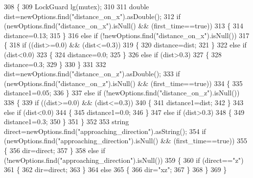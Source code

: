 \begin{DoxyCode}
308 \{
309     LockGuard lg(mutex);
310 
311     \textcolor{keywordtype}{double} dist=newOptions.find(\textcolor{stringliteral}{"distance\_on\_x"}).asDouble();
312     \textcolor{keywordflow}{if} (newOptions.find(\textcolor{stringliteral}{"distance\_on\_x"}).isNull() && (first\_time==\textcolor{keyword}{true}))
313     \{
314         distance=0.13;
315     \}
316     \textcolor{keywordflow}{else} \textcolor{keywordflow}{if} (!newOptions.find(\textcolor{stringliteral}{"distance\_on\_x"}).isNull())
317     \{
318         \textcolor{keywordflow}{if} ((dist>=0.0) && (dist<=0.3))
319         \{
320             distance=dist;
321         \}
322         \textcolor{keywordflow}{else} \textcolor{keywordflow}{if} (dist<0.0)
323         \{
324             distance=0.0;
325         \}
326         \textcolor{keywordflow}{else} \textcolor{keywordflow}{if} (dist>0.3)
327         \{
328             distance=0.3;
329         \}
330     \}
331 
332     dist=newOptions.find(\textcolor{stringliteral}{"distance\_on\_z"}).asDouble();
333     \textcolor{keywordflow}{if} (newOptions.find(\textcolor{stringliteral}{"distance\_on\_z"}).isNull() && (first\_time==\textcolor{keyword}{true}))
334     \{
335         distance1=0.05;
336     \}
337     \textcolor{keywordflow}{else} \textcolor{keywordflow}{if} (!newOptions.find(\textcolor{stringliteral}{"distance\_on\_z"}).isNull())
338     \{
339         \textcolor{keywordflow}{if} ((dist>=0.0) && (dist<=0.3))
340         \{
341             distance1=dist;
342         \}
343         \textcolor{keywordflow}{else} \textcolor{keywordflow}{if} (dist<0.0)
344         \{
345             distance1=0.0;
346         \}
347         \textcolor{keywordflow}{else} \textcolor{keywordflow}{if} (dist>0.3)
348         \{
349             distance1=0.3;
350         \}
351     \}
352 
353     \textcolor{keywordtype}{string} direct=newOptions.find(\textcolor{stringliteral}{"approaching\_direction"}).asString();
354     \textcolor{keywordflow}{if} (newOptions.find(\textcolor{stringliteral}{"approaching\_direction"}).isNull() && (first\_time==\textcolor{keyword}{true}))
355     \{
356         dir=direct;
357     \}
358     \textcolor{keywordflow}{else} \textcolor{keywordflow}{if} (!newOptions.find(\textcolor{stringliteral}{"approaching\_direction"}).isNull())
359     \{
360         \textcolor{keywordflow}{if} (direct==\textcolor{stringliteral}{"z"})
361         \{
362             dir=direct;
363         \}
364         \textcolor{keywordflow}{else}
365         \{
366             dir=\textcolor{stringliteral}{"xz"};
367         \}
368     \}
369 \}
\end{DoxyCode}


